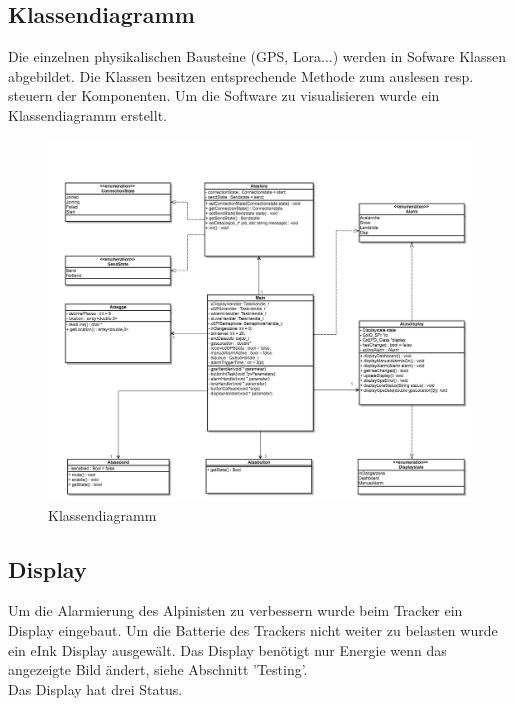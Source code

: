 \documentclass[11pt,english,german]{report}
\theoremstyle{definition}
\begin{document}
\newpage
\subsection{Klassendiagramm}
Die einzelnen physikalischen Bausteine (GPS, Lora...) werden in Sofware Klassen abgebildet. Die Klassen besitzen entsprechende Methode zum auslesen resp. steuern der Komponenten. Um die Software zu visualisieren wurde ein Klassendiagramm erstellt.
\begin{figure}[H]
	\centering
	\includegraphics[width=\textwidth]{img/prototype/classdiagram.jpg}
	\caption[Klassendiagramm]
	{Klassendiagramm}
\end{figure}

\newpage
\subsection{Display}
Um die Alarmierung des Alpinisten zu verbessern wurde beim Tracker ein Display eingebaut. Um die Batterie des Trackers nicht weiter zu belasten wurde ein eInk Display ausgewält. Das Display benötigt nur Energie wenn das angezeigte Bild ändert, siehe Abschnitt 'Testing'.\\[0.3cm]
Das Display hat drei Status.
\end{document}
